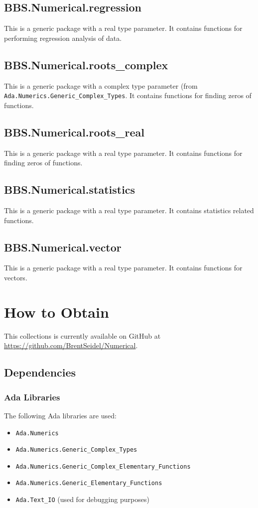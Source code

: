 \documentclass[10pt, openany]{book}
\newcommand{\package}[1]{\texttt{#1}}
\begin{document}
\section{BBS.Numerical.regression}
This is a generic package with a real type parameter.  It contains functions for performing regression analysis of data.

\section{BBS.Numerical.roots\_complex}
This is a generic package with a complex type parameter (from \package{Ada.Numerics.Generic\_Complex\_Types}.  It contains functions for finding zeros of functions.

\section{BBS.Numerical.roots\_real}
This is a generic package with a real type parameter.  It contains functions for finding zeros of functions.

\section{BBS.Numerical.statistics}
This is a generic package with a real type parameter.  It contains statistics related functions.

\section{BBS.Numerical.vector}
This is a generic package with a real type parameter.  It contains functions for vectors.


\chapter{How to Obtain}

This collections is currently available on GitHub at \url{https://github.com/BrentSeidel/Numerical}.

\section{Dependencies}
\subsection{Ada Libraries}
The following Ada libraries are used:
\begin{itemize}
  \item \package{Ada.Numerics}
  \item \package{Ada.Numerics.Generic\_Complex\_Types}
  \item \package{Ada.Numerics.Generic\_Complex\_Elementary\_Functions}
  \item \package{Ada.Numerics.Generic\_Elementary\_Functions}
  \item \package{Ada.Text\_IO} (used for debugging purposes)
\end{itemize}
\end{document}
